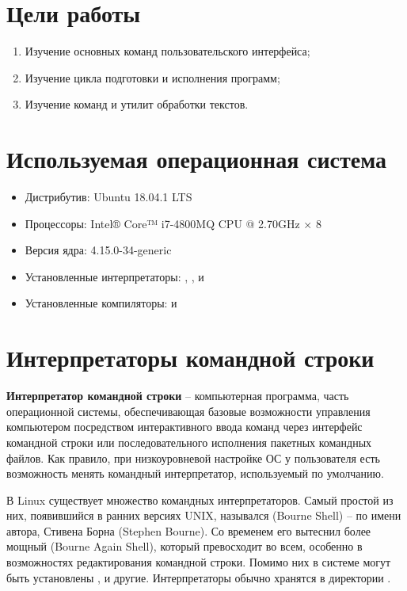 





\tableofcontents
\newpage

\section{Цели работы}

\begin{enumerate}
	\item Изучение основных команд пользовательского интерфейса;
	\item Изучение цикла подготовки и исполнения программ;
	\item Изучение команд и утилит обработки текстов.
\end{enumerate}

\section{Используемая операционная система}

\begin{itemize}
	\item Дистрибутив: Ubuntu 18.04.1 LTS
	\item Процессоры: Intel® Core™ i7-4800MQ CPU @ 2.70GHz × 8
	\item Версия ядра: 4.15.0-34-generic
	\item Установленные интерпретаторы: , ,  и 
	\item Установленные компиляторы:  и 
\end{itemize}

\vspace{-1em}
\section{Интерпретаторы командной строки}

\textbf{Интерпретатор командной строки} -- компьютерная программа, часть операционной системы, обеспечивающая базовые возможности управления компьютером посредством интерактивного ввода команд через интерфейс командной строки или последовательного исполнения пакетных командных файлов. Как правило, при низкоуровневой настройке ОС у пользователя есть возможность менять командный интерпретатор, используемый по умолчанию.

В Linux существует множество командных интерпретаторов. Самый простой из них, появившийся в ранних версиях UNIX, назывался  (Bourne Shell) -- по имени автора, Стивена Борна (Stephen Bourne). Со временем его вытеснил более мощный  (Bourne Again Shell), который превосходит  во всем, особенно в возможностях редактирования командной строки. Помимо них в системе могут быть установлены ,  и другие. Интерпретаторы обычно хранятся в директории .

